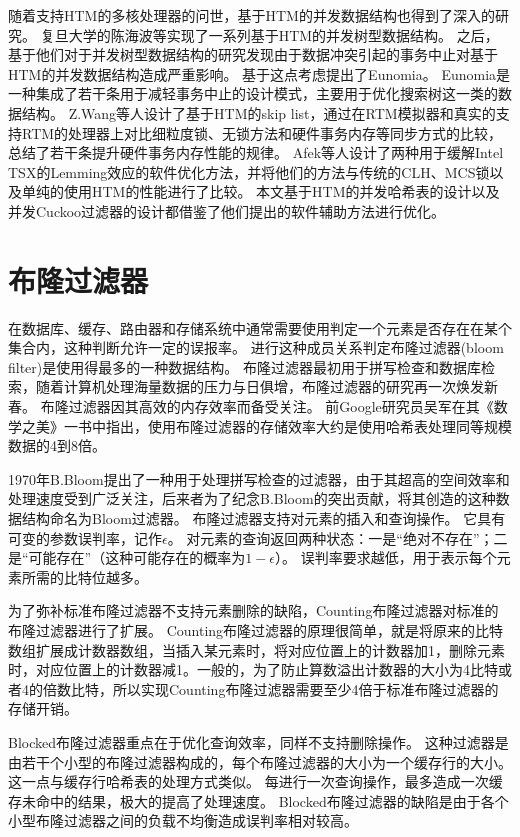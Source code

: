 随着支持HTM的多核处理器的问世，基于HTM的并发数据结构也得到了深入的研究。
复旦大学的陈海波等实现了一系列基于HTM的并发树型数据结构\cite{wang2014using,wei2015fast,chen2016fast}。
之后，基于他们对于并发树型数据结构的研究发现由于数据冲突引起的事务中止对基于HTM的并发数据结构造成严重影响。
基于这点考虑提出了Eunomia\cite{wang2017eunomia}。
Eunomia是一种集成了若干条用于减轻事务中止的设计模式，主要用于优化搜索树这一类的数据结构。
Z.Wang等人设计了基于HTM的skip list\cite{wang2013opportunities}，通过在RTM模拟器和真实的支持RTM的处理器上对比细粒度锁、无锁方法和硬件事务内存等同步方式的比较，总结了若干条提升硬件事务内存性能的规律。
Afek\cite{Afek2014Software}等人设计了两种用于缓解Intel TSX的Lemming效应的软件优化方法，并将他们的方法与传统的CLH、MCS锁以及单纯的使用HTM的性能进行了比较。
本文基于HTM的并发哈希表的设计以及并发Cuckoo过滤器的设计都借鉴了他们提出的软件辅助方法进行优化。

\section{布隆过滤器}

在数据库、缓存、路由器和存储系统中通常需要使用判定一个元素是否存在在某个集合内，这种判断允许一定的误报率。
进行这种成员关系判定布隆过滤器(bloom filter)是使用得最多的一种数据结构\cite{bloom1970space}。
布隆过滤器最初用于拼写检查和数据库检索，随着计算机处理海量数据的压力与日俱增，布隆过滤器的研究再一次焕发新春。
布隆过滤器因其高效的内存效率而备受关注。
前Google研究员吴军\cite{吴军2012数学之美}在其《数学之美》一书中指出，使用布隆过滤器的存储效率大约是使用哈希表处理同等规模数据的4到8倍。

1970年B.Bloom\cite{bloom1970space}提出了一种用于处理拼写检查的过滤器，由于其超高的空间效率和处理速度受到广泛关注，后来者为了纪念B.Bloom的突出贡献，将其创造的这种数据结构命名为Bloom过滤器。
布隆过滤器支持对元素的插入和查询操作。
它具有可变的参数误判率，记作$\epsilon$。
对元素的查询返回两种状态：一是“绝对不存在”；二是“可能存在”（这种可能存在的概率为$1-\epsilon$）。
误判率要求越低，用于表示每个元素所需的比特位越多。

为了弥补标准布隆过滤器不支持元素删除的缺陷，Counting布隆过滤器\cite{fan1998summary}对标准的布隆过滤器进行了扩展。
Counting布隆过滤器的原理很简单，就是将原来的比特数组扩展成计数器数组，当插入某元素时，将对应位置上的计数器加1，删除元素时，对应位置上的计数器减1。一般的，为了防止算数溢出计数器的大小为4比特或者4的倍数比特，所以实现Counting布隆过滤器需要至少4倍于标准布隆过滤器的存储开销。

Blocked布隆过滤器\cite{putze2007cache}重点在于优化查询效率，同样不支持删除操作。
这种过滤器是由若干个小型的布隆过滤器构成的，每个布隆过滤器的大小为一个缓存行的大小。
这一点与缓存行哈希表\cite{clht}的处理方式类似。
每进行一次查询操作，最多造成一次缓存未命中的结果，极大的提高了处理速度。
Blocked布隆过滤器的缺陷是由于各个小型布隆过滤器之间的负载不均衡造成误判率相对较高。


